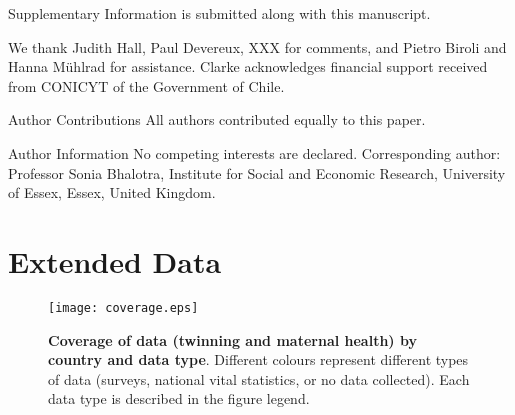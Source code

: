 \documentclass{nature}
\begin{document}
\begin{linenumbers}

\clearpage



\clearpage
\begin{addendum}
 \item[Supplementary Information] is submitted along with this manuscript.
 \item We thank Judith Hall, Paul Devereux, XXX for comments, and Pietro Biroli and Hanna M\"uhlrad for assistance.  Clarke acknowledges financial support received from CONICYT of the Government of Chile.
 \item[Author Contributions] All authors contributed equally to this paper.
 \item[Author Information] No competing interests are declared.  Corresponding author: Professor Sonia Bhalotra, Institute for Social and Economic Research, University of Essex, Essex, United Kingdom.
\end{addendum}

\clearpage
\section{Extended Data}
\setcounter{figure}{0}
\setcounter{table}{0}
\renewcommand{\tablename}{Extended Data Table}
\renewcommand{\figurename}{Extended Data Figure}

\begin{spacing}{1}
\begin{figure}[htpb!]
\texttt{[image: coverage.eps]}
\caption{\textbf{Coverage of data (twinning and maternal health) by country and data type}. {\footnotesize  Different colours represent different types of data (surveys, national vital statistics, or no data collected).  Each data type is described in the figure legend.}}
\label{fig:twincoverage}
\end{figure}



\end{spacing}
\end{linenumbers}
\end{document}
